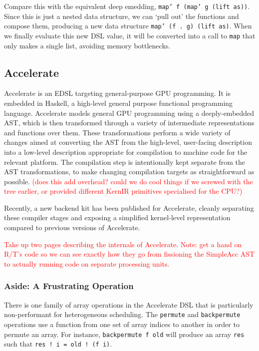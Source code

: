\documentclass[a4paper,12pt]{article}
\newcommand{\red}[1]{\textcolor{red}{#1}}
\newcommand{\icf}[1]{\mbox{\texttt{#1}}}
\begin{document}
Compare this with the equivalent deep emedding, \icf{map'\ f\ (map'\ g\ (lift\ as))}. 
Since this is just a nested data structure, we can `pull out' the functions and compose them, producing a new data structure \icf{map'\ (f\ .\ g)\ (lift\ as)}.
When we finally evaluate this new DSL value, it will be converted into a call to \icf{map} that only makes a single list, avoiding memory bottlenecks.

\subsection{Accelerate}

Accelerate is an EDSL targeting general-purpose GPU programming. 
It is embedded in Haskell, a high-level general purpose functional programming language.
Accelerate models general GPU programming using a deeply-embedded AST, which is then transformed through a variety of intermediate representations and functions over them.
These transformations perform a wide variety of changes aimed at converting the AST from the high-level, user-facing description into a low-level description appropriate for compilation to machine code for the relevant platform.
The compilation step is intentionally kept separate from the AST transformations, to make changing compilation targets as straightforward as possible.
\red{(does this add overhead? could we do cool things if we screwed with the tree earlier, or provided different KernIR primitives specialised for the CPU?)}

Recently, a new backend kit has been published for Accelerate, cleanly separating these compiler stages and exposing a simplified kernel-level representation compared to previous versions of Accelerate.

\red{Take up two pages describing the internals of Accelerate. Note: get a hand on R/T's code so we can see exactly how they go from fissioning the SimpleAcc AST to actually running code on separate processing units.}

\subsubsection*{Aside: A Frustrating Operation}
There is one family of array operations in the Accelerate DSL that is particularly non-performant for heterogeneous scheduling.
The \icf{permute} and \icf{backpermute} operations use a function from one set of array indices to another in order to permute an array.
For instance, \icf{backpermute\ f\ old} will produce an array \icf{res} such that \icf{res\ !\ i =\ old !\ (f\ i)}.
\end{document}
